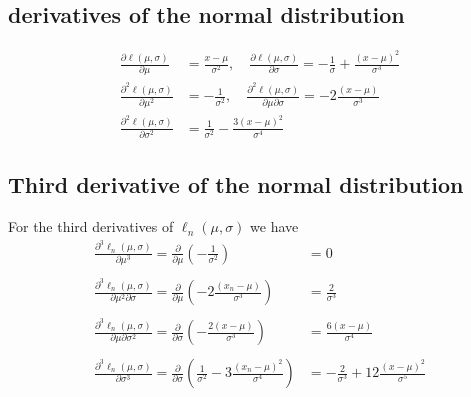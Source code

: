 \documentclass{article}
\begin{document}
\subsection{derivatives of the normal distribution}
\begin{equation*}
\begin{split}
    \frac{\partial \ell\left(\mu, \sigma\right)}{\partial\mu} &= \frac{x - \mu}{\sigma^2}, \quad \frac{\partial \ell\left(\mu,\sigma\right)}{\partial \sigma} = - \frac{1}{\sigma} + \frac{\left(x - \mu\right)^2}{\sigma^3} \\
    \frac{\partial^2 \ell\left(\mu, \sigma\right)}{\partial \mu ^2} &= -\frac{1}{\sigma^2}, \quad \frac{\partial^2 \ell\left(\mu, \sigma\right)}{\partial \mu \partial\sigma} = -2\frac{\left(x - \mu\right)}{\sigma^3} \\
    \frac{\partial^2 \ell\left(\mu, \sigma\right)}{\partial \sigma^2} &= \frac{1}{\sigma^2} - \frac{3\left(x - \mu\right)^2}{\sigma^4}
\end{split}
\end{equation*}{}
\subsection{Third derivative of the normal distribution}
For the third derivatives of $\ell_n\left(\mu, \sigma\right)$ we have 
\begin{equation}
  \begin{split}
  \frac{\partial^3 \ell_n\left(\mu, \sigma\right)}{\partial\mu^3} = \frac{\partial}{\partial \mu}\left(-\frac{1}{\sigma^2}\right) &= 0\\ \\
  \frac{\partial^3 \ell_n(\mu, \sigma)}{\partial\mu^2\partial\sigma} = \frac{\partial}{\partial \mu}\left(-2\frac{\left(x_n - \mu\right)}{\sigma^3}\right) & = \frac{2}{\sigma^3} \\ \\
  \frac{\partial^3 \ell_n(\mu, \sigma)}{\partial\mu \partial\sigma^2} = \frac{\partial}{\partial \sigma}\left(-\frac{2\left(x-\mu\right)}{\sigma^3}\right)&= \frac{6\left(x-\mu\right)}{\sigma^4} \\ \\
  \frac{\partial^3\ell_n(\mu, \sigma)}{\partial\sigma^3} = \frac{\partial}{\partial \sigma} \left(\frac{1}{\sigma^2} - 3\frac{\left(x_n - \mu\right)^2}{\sigma^4}\right)  & = -\frac{2}{\sigma^3}  + 12 \frac{\left(x - \mu \right)^2}{\sigma^5}
\end{split}
\end{equation}
\end{document}
